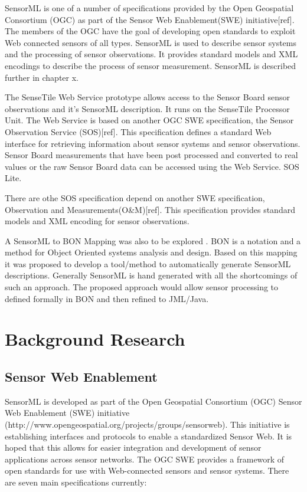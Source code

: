 \documentclass[]{final_report}
\begin{document}
SensorML is one of a number of specifications provided by the Open Geospatial Consortium (OGC) as part of the Sensor Web Enablement(SWE) initiative[ref]. The members of the OGC have the goal of developing open standards to exploit Web connected sensors of all types. SensorML is used to describe sensor systems and the processing of sensor observations. It provides standard models and XML encodings to describe the process of sensor measurement. SensorML is described further in chapter x.

The SenseTile Web Service prototype allows access to the Sensor Board sensor observations and it's SensorML description. It runs on the SenseTile Processor Unit.  The Web Service is based on another OGC SWE  specification, the Sensor Observation Service (SOS)[ref]. This specification defines a standard Web interface for retrieving information about sensor systems and sensor observations. Sensor Board measurements that have been post processed and converted to real values or the raw Sensor Board data can be accessed using the Web Service. SOS Lite.

There are othe  SOS specification depend on another SWE specification, Observation and Measurements(O\&M)[ref]. This specification provides standard models and XML encoding for sensor observations.

A  SensorML to BON Mapping was also to be explored . BON\cite{BONref} is a notation and a method for Object Oriented systems analysis and design. Based on this mapping it was proposed to develop a tool/method to automatically generate SensorML descriptions. Generally SensorML is hand generated with all the shortcomings of such an approach. The proposed approach would allow sensor processing to defined formally in BON and then refined to JML/Java. 


\chapter{ Background Research}


\section{Sensor Web Enablement}
SensorML is developed as part of the Open Geospatial Consortium (OGC) Sensor Web Enablement (SWE) initiative (http://www.opengeospatial.org/projects/groups/sensorweb). This initiative is establishing interfaces and protocols to enable a standardized Sensor Web. It is hoped that this allows for easier integration and development of sensor applications across sensor networks. The OGC SWE provides a framework of open standards for use with Web-connected sensors and sensor systems. There are seven main specifications currently:
\end{document}
